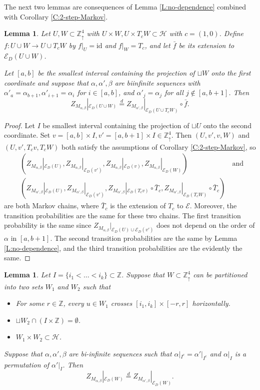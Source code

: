 \documentclass[aop, preprint]{imsart}
\theoremstyle{plain}
\newtheorem{lemma}[theorem]{Lemma}
\theoremstyle{definition}
\theoremstyle{plain}
\newcommand{\sset}{\subset}
\newcommand{\al}{\alpha}
\newcommand{\mathand}{\;\text{and}\;}
\newcommand{\be}{\beta}
\newcommand{\scrE}{\mathcal{E}}
\newcommand{\Zd}{\mathds{Z}^4_\uparrow}
\newcommand{\scrH}{\mathcal{H}}
\newcommand{\Z}{\mathds{Z}}
\newcommand{\eqd}{\stackrel{d}{=}}
\newcommand{\X}{\times}
\newcommand{\id}{\text{id}}
\begin{document}
The next two lemmas are consequences of Lemma \ref{L:no-dependence} combined with Corollary \ref{C:2-step-Markov}.

\begin{lemma}
	\label{L:one-shift}
	Let $U, W \sset \Zd$ with $U \X W, U \X T_{c}W \sset \scrH$ with $c = (1,0)$. Define $f:U \cup W \to U \cup T_c W$ by $f|_U = \id$ and $f|_W = T_{c}$, and let $\bar f$ be its extension to $\scrE_D(U \cup W)$.
	
	Let $[a, b]$ be the smallest interval containing the projection of $\sqcup W$ onto the first coordinate and suppose that $\al, \al', \be$ are biinfinite sequences with $\al'_a = \al_{b+1}, \al'_{i+1} = \al_i$ for $i \in [a, b]$, and $\al'_j = \al_j$ for all $j \notin [a, b + 1]$. Then
	$$
	Z_{M_{\al, \be}}|_{\scrE_D(U \cup W)} \eqd Z_{M_{\al', \be}}|_{\scrE_D(U \cup T_c W)} \circ \bar f.
	$$ 
\end{lemma}

\begin{proof}
	Let $I$ be smallest interval containing the projection of $\sqcup U$ onto the second coordinate. Set $v = [a, b] \X I, v' = [a, b + 1] \X I \in \Zd$. Then $(U, v', v, W)$ and $(U, v', T_c v, T_c W)$ both satisfy the assumptions of Corollary \ref{C:2-step-Markov}, so
	\begin{align*}
	&(Z_{M_{\al, \be}}|_{\scrE_D(U)}, Z_{M_{\al, \be}}|_{\scrE_D(v')}, Z_{M_{\al, \be}}|_{\scrE_D(v)}, Z_{M_{\al, \be}}|_{\scrE_D(W)}) \qquad \qquad \qquad \mathand \\
	&(Z_{M_{\al', \be}}|_{\scrE_D(U)}, Z_{M_{\al', \be}}|_{\scrE_D(v')}, Z_{M_{\al', \be}}|_{\scrE_D(T_c v)} \circ \bar T_c , Z_{M_{\al', \be}}|_{\scrE_D(T_c W)} \circ \bar T_c ) 
	\end{align*}
	are both Markov chains, where $\bar T_c$ is the extension of $T_c$ to $\scrE$. Moreover, the transition probabilities are the same for these two chains. The first transition probability is the same since $Z_{M_{\al, \be}}|_{\scrE_D(U) \cup \scrE_D(v')}$ does not depend on the order of $\al$ in $[a, b+1]$. The second transition probabilities are the same by Lemma \ref{L:no-dependence}, and the third transition probabilities are the evidently the same.
\end{proof}

\begin{lemma}
	\label{L:permute-ab}
	Let $I = \{i_1 < \dots < i_k\} \sset \Z$. Suppose that $W \sset \Zd$ can be partitioned into two sets $W_1$ and $W_2$ such that
	\begin{itemize}[nosep]
		\item For some $r \in \Z$, every $u \in W_1$ crosses $[i_1, i_k] \X [-r, r]$ horizontally.
		\item $\sqcup W_2 \cap (I \X \Z) = \emptyset$.
		\item $W_1 \X W_2 \sset \scrH$.
	\end{itemize}
	Suppose that $\al, \al', \be$ are bi-infinite sequences such that $\al|_{I^c} = \al'|_{I^c}$ and $\al|_I$ is a permutation of $\al'|_{I}$. Then 
	$$
	Z_{M_{\al, \be}}|_{\scrE_D(W)} \eqd Z_{M_{\al', \be}}|_{\scrE_D(W)}.
	$$
\end{lemma}
\end{document}
